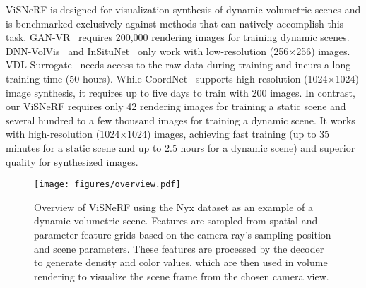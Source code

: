 ViSNeRF is designed for visualization synthesis of dynamic volumetric scenes and is benchmarked exclusively against methods that can natively accomplish this task. GAN-VR~\cite{Berger-TFGAN-TVCG19} requires 200,000 rendering images for training dynamic scenes. DNN-VolVis~\cite{Hong-DNN-VolVis-PVIS19} and InSituNet~\cite{He-InSituNet-TVCG20} only work with low-resolution (256$\times$256) images. VDL-Surrogate~\cite{Shi-VDL-TVCG22} needs access to the raw data during training and incurs a long training time (50 hours). While CoordNet~\cite{Han-CoordNet-TVCG} supports high-resolution (1024$\times$1024) image synthesis, it requires up to five days to train with 200 images. In contrast, our ViSNeRF requires only 42 rendering images for training a static scene and several hundred to a few thousand images for training a dynamic scene. It works with high-resolution (1024$\times$1024) images, achieving fast training (up to 35 minutes for a static scene and up to 2.5 hours for a dynamic scene) and superior quality for synthesized images.

\begin{figure*}[htb]
  \begin{center}
    \texttt{[image: figures/overview.pdf]}\\
 \end{center}
\vspace{-.25in} 
 \caption{Overview of ViSNeRF using the Nyx dataset as an example of a dynamic volumetric scene. Features are sampled from spatial and parameter feature grids based on the camera ray's sampling position and scene parameters. These features are processed by the decoder to generate density and color values, which are then used in volume rendering to visualize the scene frame from the chosen camera view.}
 \label{fig:overview}
\end{figure*}

